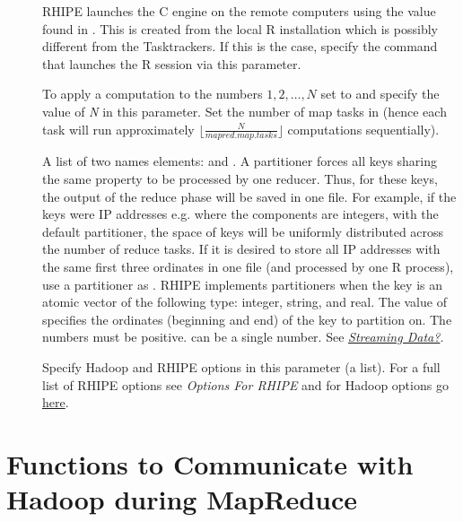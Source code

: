 \documentclass[letterpaper,10pt,english]{sphinxmanual}
\begin{document}
\begin{description}
\item[{}] \leavevmode
RHIPE launches the C engine on the remote computers using the value
found in . This is created from the local R
installation which is possibly different from the Tasktrackers. If this is the
case, specify the command that launches the R session via this parameter.

\item[{}] \leavevmode
To apply a computation to the numbers $1,2,\ldots,N$ set 
to  and specify the value of \emph{N} in this parameter. Set the number
of map tasks in  (hence each task will run approximately
$\lfloor \frac{N}{mapred.map.tasks} \rfloor$ computations sequentially).

\item[{}] \leavevmode
A list of two names elements:  and . A
partitioner forces all keys sharing the same property to be processed by one
reducer. Thus, for these keys, the output of the reduce phase will be saved in
one file. For example, if the keys were IP addresses e.g. 
where the components are integers, with the default partitioner, the space of
keys will be uniformly distributed across the number of reduce tasks. If it is
desired to store all IP addresses with the same first three ordinates in one file (and processed by one R process), use a
partitioner as . RHIPE implements
partitioners when the key is an atomic vector of the following type: integer,
string, and real. The value of  specifies the ordinates (beginning and end) of the key
to partition on. The numbers must be positive.  can be a single number. See \hyperref[airline:streaming-data]{\emph{Streaming Data?}}.

\item[{}] \leavevmode
Specify Hadoop and RHIPE options in this parameter (a list). For a full list of
RHIPE options see \emph{Options For RHIPE} and for  Hadoop options go \href{http://hadoop.apache.org/common/docs/current/mapred-default.html}{here}.

\end{description}


\section{Functions to Communicate with Hadoop during MapReduce}
\label{mr:insidemr}\label{mr:functions-to-communicate-with-hadoop-during-mapreduce}
\end{document}
